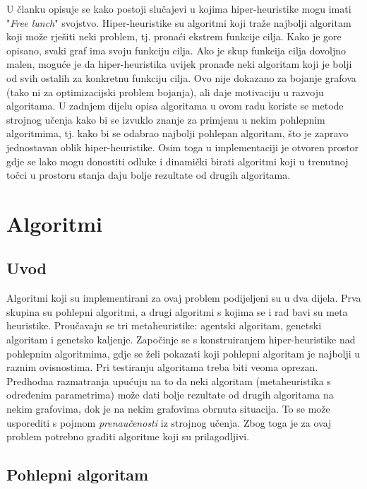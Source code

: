 \documentclass[times, utf8, diplomski, numeric]{fer}
\begin{document}
U članku \cite{conf/eurogp/PoliG09} opisuje se kako postoji slučajevi u kojima hiper-heuristike mogu imati "\emph{Free lunch}" svojstvo. Hiper-heuristike su algoritmi koji traže najbolji algoritam koji može rješiti neki problem, tj. pronaći ekstrem funkcije cilja. Kako je gore opisano, svaki graf ima svoju funkciju cilja. Ako je skup funkcija cilja dovoljno malen, moguće je da hiper-heuristika uvijek pronađe neki algoritam koji je bolji od svih ostalih za konkretnu funkciju cilja. Ovo nije dokazano za bojanje grafova (tako ni za optimizacijski problem bojanja), ali daje motivaciju u razvoju algoritama. U zadnjem dijelu opisa algoritama u ovom radu koriste se metode strojnog učenja kako bi se izvuklo znanje za primjenu u nekim pohlepnim algoritmima, tj. kako bi se odabrao najbolji pohlepan algoritam, što je zapravo jednostavan oblik hiper-heuristike. Osim toga u implementaciji je otvoren prostor gdje se lako mogu donostiti odluke i dinamički birati algoritmi koji u trenutnoj točci u prostoru stanja daju bolje rezultate od drugih algoritama.

\chapter{Algoritmi}

\section{Uvod}

Algoritmi koji su implementirani za ovaj problem podijeljeni su u dva dijela. Prva skupina su pohlepni algoritmi, a drugi algoritmi s kojima se i rad bavi su meta heuristike. Proučavaju se tri metaheuristike: agentski algoritam, genetski algoritam i genetsko kaljenje. Započinje se s konstruiranjem hiper-heuristike nad pohlepnim algoritmima, gdje se želi pokazati koji pohlepni algoritam je najbolji u raznim ovisnostima. Pri testiranju algoritama treba biti veoma oprezan. Predhodna razmatranja upućuju na to da neki algoritam (metaheuristika s određenim parametrima) može dati bolje rezultate od drugih algoritama na nekim grafovima, dok je na nekim grafovima obrnuta situacija. To se može usporediti s pojmom \emph{prenaučenosti} iz strojnog učenja. Zbog toga je za ovaj problem potrebno graditi algoritme koji su prilagodljivi.

\section{Pohlepni algoritam}
\end{document}
